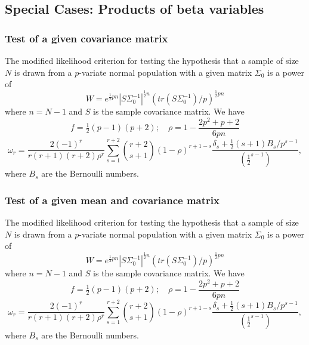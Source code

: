 \subsection{Special Cases: Products of beta variables}
\label{Box expansion special cases}





\subsubsection{Test of a given covariance matrix}
The modified likelihood criterion for testing the hypothesis that a sample of size $N$ is drawn from a $p$-variate normal population with a given matrix $\Sigma_0$ is a power of
\begin{equation}
	W = e^{\tfrac{1}{2}pn} |S \Sigma_0^{-1}|^{\tfrac{1}{2}n} \left(tr(S \Sigma_0^{-1})/p \right)^{\tfrac{1}{2}pn}
\end{equation}
where $n=N-1$ and $S$ is the sample covariance matrix. We have
\begin{equation}
	f=\tfrac{1}{2}(p-1)(p+2); \quad \rho=1-\frac{2p^2+p+2}{6pn}
\end{equation}
\begin{equation}
	\omega_r = \frac{2(-1)^r}{r(r+1)(r+2) \rho^r} \sum_{s=1}^{r+2} \binom{r+2}{s+1} (1-\rho)^{r+1-s} \frac{\delta_s + \tfrac{1}{2}(s+1) B_s / p^{s-1}}{(\tfrac{1}{2}^{s-1})}, 
\end{equation}
where $B_s$ are the Bernoulli numbers.


\subsubsection{Test of a given mean and covariance matrix}
The modified likelihood criterion for testing the hypothesis that a sample of size $N$ is drawn from a $p$-variate normal population with a given matrix $\Sigma_0$ is a power of
\begin{equation}
	W = e^{\tfrac{1}{2}pn} |S \Sigma_0^{-1}|^{\tfrac{1}{2}n} \left(tr(S \Sigma_0^{-1})/p \right)^{\tfrac{1}{2}pn}
\end{equation}
where $n=N-1$ and $S$ is the sample covariance matrix. We have
\begin{equation}
	f=\tfrac{1}{2}(p-1)(p+2); \quad \rho=1-\frac{2p^2+p+2}{6pn}
\end{equation}
\begin{equation}
	\omega_r = \frac{2(-1)^r}{r(r+1)(r+2) \rho^r} \sum_{s=1}^{r+2} \binom{r+2}{s+1} (1-\rho)^{r+1-s} \frac{\delta_s + \tfrac{1}{2}(s+1) B_s / p^{s-1}}{(\tfrac{1}{2}^{s-1})}, 
\end{equation}
where $B_s$ are the Bernoulli numbers.




